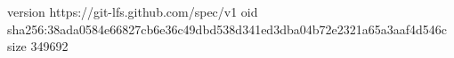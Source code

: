 version https://git-lfs.github.com/spec/v1
oid sha256:38ada0584e66827cb6e36c49dbd538d341ed3dba04b72e2321a65a3aaf4d546c
size 349692
